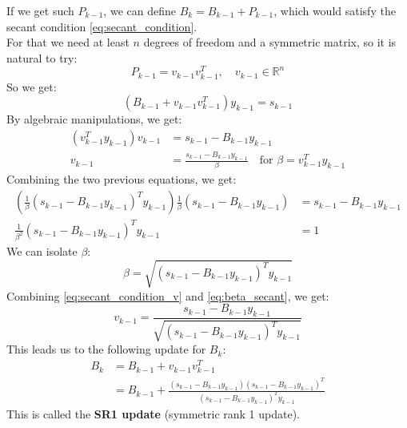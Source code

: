 \documentclass[12pt, openany]{report}
\newcommand{\R}{\mathbb{R}}
\theoremstyle{definition}
\begin{document}
If we get such $P_{k-1}$, we can define $B_k = B_{k-1} + P_{k-1}$, which would satisfy the secant condition \eqref{eq:secant_condition}.\\
For that we need at least $n$ degrees of freedom and a symmetric matrix, so it is natural to try:
\begin{equation}
	P_{k-1} = v_{k-1} v_{k-1}^T, \quad v_{k-1} \in \R^{n}
\end{equation}
So we get:
\begin{equation}
	\left(B_{k-1} + v_{k-1} v_{k-1}^T\right) y_{k-1} = s_{k-1}
\end{equation}
By algebraic manipulations, we get:
\begin{equation}\label{eq:secant_condition_v}
	\begin{aligned}
		\left(v_{k-1}^T y_{k-1}\right) v_{k-1} &= s_{k-1} - B_{k-1} y_{k-1}\\
		v_{k-1} &= \frac{s_{k-1}-B_{k-1} y_{k-1}}{\beta} \quad \text{for } \beta = v_{k-1}^T y_{k-1} 
	\end{aligned}
\end{equation}
Combining the two previous equations, we get:
\begin{equation}
	\begin{aligned}
		\left(\frac{1}{\beta} \left(s_{k-1} - B_{k-1} y_{k-1}\right)^T y_{k-1} \right)\frac{1}{\beta} \left(s_{k-1} - B_{k-1} y_{k-1}\right) &= s_{k-1} - B_{k-1} y_{k-1}\\
		\frac{1}{\beta^2} \left(s_{k-1} - B_{k-1} y_{k-1}\right)^T y_{k-1} &= 1
	\end{aligned}
\end{equation}
We can isolate $\beta$:
\begin{equation}\label{eq:beta_secant}
	\beta = \sqrt{\left(s_{k-1} - B_{k-1} y_{k-1}\right)^T y_{k-1}}
\end{equation}
Combining \eqref{eq:secant_condition_v} and \eqref{eq:beta_secant}, we get:
\begin{equation}
	v_{k-1} = \frac{s_{k-1}-B_{k-1} y_{k-1}}{\sqrt{\left(s_{k-1} - B_{k-1} y_{k-1}\right)^T y_{k-1}}}
\end{equation}
This leads us to the following update for $B_k$:
\begin{equation}
	\begin{aligned}
		B_k &= B_{k-1} + v_{k-1} v_{k-1}^T\\
		&= B_{k-1} + \frac{\left(s_{k-1}-B_{k-1} y_{k-1}\right)\left(s_{k-1}-B_{k-1} y_{k-1}\right)^T}{\left(s_{k-1} - B_{k-1} y_{k-1}\right)^T y_{k-1}}
	\end{aligned}
\end{equation}
This is called the \textbf{SR1 update} (symmetric rank 1 update).\\
\end{document}
